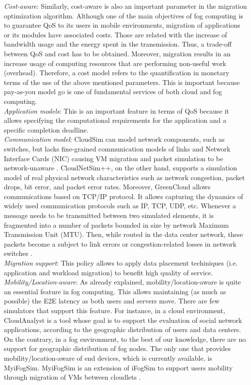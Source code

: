 \noindent\tab \textit{Cost-aware}: Similarly, cost-aware is also an important parameter in the migration optimization algorithm. Although one of the main objectives of fog computing is to guarantee QoS to its users in mobile environments, migration of applications or its modules have associated costs. Those are related with the increase of bandwidth usage and the energy spent in the transmission. Thus, a trade-off between QoS and cost has to be obtained. Moreover, migration results in an increase usage of computing resources that are performing non-useful work (overhead). Therefore, a cost model refers to the quantification in monetary terms of the use of the above mentioned parameters. This is important because pay-as-you model go is one of fundamental services of both cloud and fog computing. \\
\noindent\tab \textit{Application models}: This is an important feature in terms of QoS because it allows specifying the computational requirements for the application and a specific completion deadline.\\
\noindent\tab \textit{Communication model}: CloudSim can model network components, such as switches, but lacks fine-grained communication models of links and Network Interface Cards (NIC) causing VM migration and packet simulation to be network-unaware \cite{malik2017cloudnetsim++}. CloudNetSim++, on the other hand, supports a simulation model of real physical network characteristics such as network congestion, packet drops, bit error, and packet error rates. Moreover, GreenCloud allows communications based on TCP/IP protocol. It allows capturing the dynamics of widely used communication protocols such as IP, TCP, UDP, etc. Whenever a message needs to be transmitted between two simulated elements, it is fragmented into a number of packets bounded in size by network Maximum Transmission Unit (MTU). Then, while routed in the data center network, these packets become a subject to link errors or congestion-related losses in network switches \cite{kliazovich2012greencloud}. \\
\noindent\tab \textit{Migration support}: This policy allows to apply data placement techiniques (i.e. application and workload migration) to benefit high quality of service.\\
\noindent\tab \textit{Mobility/Location-aware}: As already explained, mobility/location-aware is quite an essential feature in fog computing. This allows maintaining (as much as possible) the E2E latency as both users and servers move. There are few simulators that support this feature. For instance, in a cloud environment, CloudAnalyst \cite{wickremasinghe2010cloudanalyst} is a tool whose goal is to support the evaluation of social network applications, according to the geographic distribution of users and data centers. On the contrary, in a fog environment, to the best of our knowledge, there are no support for geographic distribution of fog nodes. The only one that provides mobility/location-aware of end devices, which is currently available, is MyiFogSim. MyiFogSim is an extension of iFogSim to support users mobility through migration of VMs between cloudlets \cite{lopes2017myifogsim}.\\
